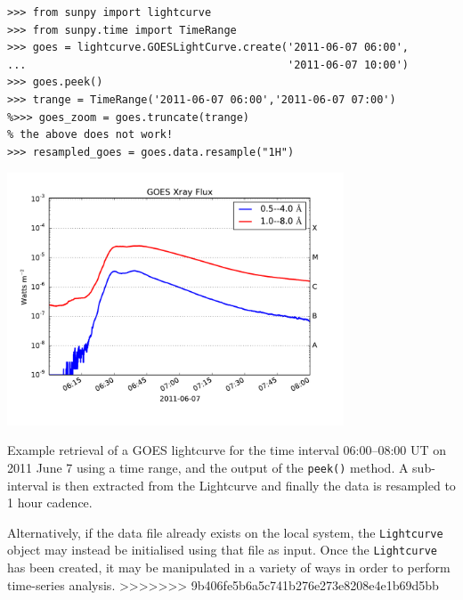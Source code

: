 \begin{listing}[H]
\begin{verbatim}
>>> from sunpy import lightcurve
>>> from sunpy.time import TimeRange
>>> goes = lightcurve.GOESLightCurve.create('2011-06-07 06:00',
...                                         '2011-06-07 10:00')
>>> goes.peek()
>>> trange = TimeRange('2011-06-07 06:00','2011-06-07 07:00')
%>>> goes_zoom = goes.truncate(trange)
% the above does not work!
>>> resampled_goes = goes.data.resample("1H")
\end{verbatim}
\begin{center}
\includegraphics[width=10cm]{goes_lightcurve.pdf}
\end{center}
\caption{Example retrieval of a GOES lightcurve for the time interval 06:00--08:00 UT on 
2011 June 7 using a time range, and the output of the \texttt{peek()} method.
A sub-interval is then extracted from the Lightcurve and finally the data is resampled
to 1 hour cadence.}
\label{code:goes_lc}
\end{listing}

Alternatively, if the data file already exists on the local system, the 
\texttt{Lightcurve} object may instead be initialised using that file as input.
Once the \texttt{Lightcurve} has been created, it may be manipulated in 
a variety of ways in order to perform time-series analysis. 
>>>>>>> 9b406fe5b6a5c741b276e273e8208e4e1b69d5bb
